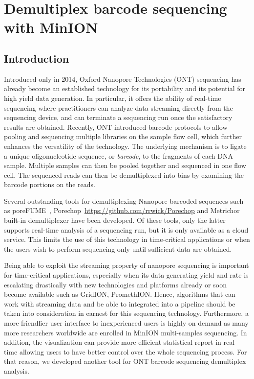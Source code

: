 \section{Demultiplex barcode sequencing with MinION}
\subsection{Introduction}

Introduced only in 2014, Oxford Nanopore Technologies (ONT) sequencing has already become an established technology for its portability and its potential for high yield data generation. 
In particular, it offers the ability of real-time sequencing where practitioners can analyze data streaming directly from the sequencing device, and can terminate a sequencing run once the satisfactory results are obtained. Recently, ONT introduced barcode protocols to allow pooling and sequencing multiple libraries on the sample flow cell, which further enhances the versatility of the technology. The underlying mechanism is to ligate a unique oligonucleotide sequence, or \emph{barcode}, to the fragments of each DNA sample. Multiple samples can then be pooled together and sequenced in one flow cell. The sequenced reads can then be demultiplexed into bins by examining the barcode portions on the reads.

Several outstanding tools for demultiplexing Nanopore barcoded sequences such as poreFUME~\cite{Van2017rapid}, Porechop~\url{https://github.com/rrwick/Porechop} and Metrichor built-in demultiplexer have been developed. Of these tools, only the latter supports real-time analysis of a sequencing run, but it is only available as a cloud service. This limits the use of this technology in time-critical applications or when the users wish to perform sequencing only until sufficient data are obtained.

Being able to exploit the streaming property of nanopore sequencing is important for time-critical applications, especially when its data generating yield and rate is escalating drastically with new technologies and platforms already or soon become available such as GridION, PromethION.
Hence, algorithms that can work with streaming data and be able to integrated into a pipeline should be taken into consideration in earnest for this sequencing technology. Furthermore, a more friendlier user interface to inexperienced users is highly on demand as many more researchers worldwide are enrolled in MinION  multi-samples sequencing. In addition, the visualization can provide more efficient statistical report in real-time allowing users to have better control over the whole sequencing process.
For that reason, we developed another tool for ONT barcode sequencing demultiplex analysis. 

